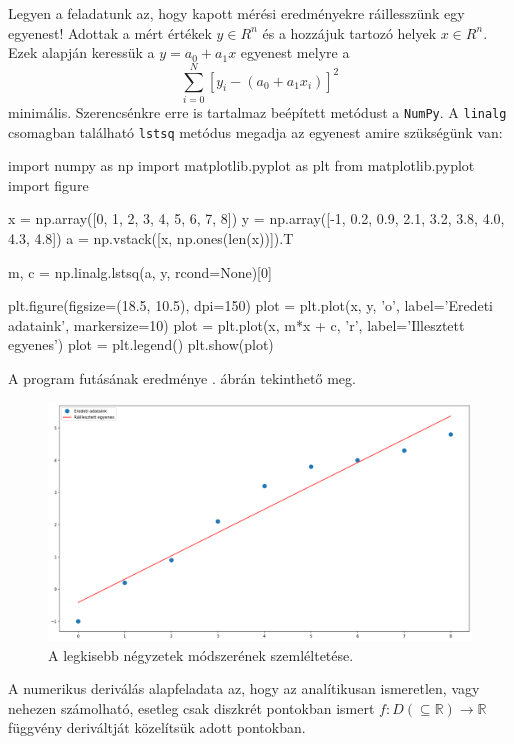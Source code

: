 Legyen a feladatunk az, hogy kapott mérési eredményekre ráillesszünk egy
egyenest! Adottak a mért értékek \(y \in R^n\) és a hozzájuk tartozó
helyek $x\in R^n$. Ezek alapján keressük a \(y= a_0+a_1x\)
egyenest melyre a
\[
\sum_{i=0}^N
[y_i - (a_0 + a_1 x_i)]^2
\]
minimális. Szerencsénkre erre is tartalmaz beépített metódust a
\texttt{NumPy}. A \texttt{linalg} csomagban található \texttt{lstsq}
metódus megadja az egyenest amire szükségünk van:
\begin{python}
import numpy as np
import matplotlib.pyplot as plt
from matplotlib.pyplot import figure 

x = np.array([0, 1, 2, 3, 4, 5, 6, 7, 8])
y = np.array([-1, 0.2, 0.9, 2.1, 3.2, 3.8, 4.0, 4.3, 4.8])
a = np.vstack([x, np.ones(len(x))]).T

m, c = np.linalg.lstsq(a, y, rcond=None)[0]

plt.figure(figsize=(18.5, 10.5), dpi=150)
plot = plt.plot(x, y, 'o', label='Eredeti adataink', markersize=10)
plot = plt.plot(x, m*x + c, 'r', label='Illesztett egyenes')
plot = plt.legend()
plt.show(plot)
\end{python}
A program futásának eredménye . ábrán tekinthető meg.

\begin{figure}[h!]
\centering
\includegraphics[width=\textwidth]{img/lsqt.png}
\caption{A legkisebb négyzetek módszerének szemléltetése.}
\label{fig:lsqt}
\end{figure}
    

A numerikus deriválás alapfeladata az, hogy az analítikusan ismeretlen,
vagy nehezen számolható, esetleg csak diszkrét pontokban ismert
\(f: D(\subseteq \mathbb{R})\rightarrow \mathbb{R}\) függvény
deriváltját közelítsük adott pontokban.

